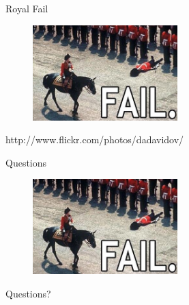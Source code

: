 \documentclass[compress]{beamer}
\begin{document}
\begin{frame}{Royal Fail}
  \begin{figure}
    \centering
    \includegraphics[width=0.5\textwidth]{assets/royal_fail.jpg}
  \end{figure}
  \tiny{http://www.flickr.com/photos/dadavidov/}
\end{frame}

\begin{frame}{Questions}
  \begin{figure}
    \centering
    \includegraphics[width=0.5\textwidth]{assets/royal_fail.jpg}
  \end{figure}
  \Large{Questions?}
\end{frame}
\end{document}
